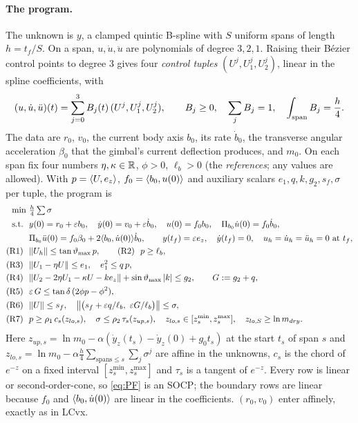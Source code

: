 \paragraph{The program.} The unknown is $y$, a clamped quintic B-spline with $S$ uniform spans of length $h=t_f/S$. On a span,
$u,\dot u,\ddot u$ are polynomials of degree $3,2,1$. Raising their B\'ezier control points to degree $3$ gives four \emph{control
tuples} $(U^j,U_1^j,U_2^j)$, linear in the spline coefficients, with
\begin{equation}\label{eq:hull}
(u,\dot u,\ddot u)(t)=\sum_{j=0}^3B_j(t)\,(U^j,U_1^j,U_2^j),\qquad B_j\ge0,\quad \sum_jB_j=1,\quad \int_{\rm span}B_j=\frac h4 .
\end{equation}
The data are $r_0$, $v_0$, the current body axis $b_0$, its rate $\dot b_0$, the transverse angular acceleration $\beta_0$ that the
gimbal's current deflection produces, and $m_0$. On each span fix four numbers $\eta,\kappa\in\mathbb{R}$, $\phi>0$, $\ell_b>0$ (the
\emph{references}; any values are allowed). With $p=\langle U,e_z\rangle$, $f_0=\langle b_0,u(0)\rangle$ and auxiliary scalars $e_1,q,k,g_2,s_f,\sigma$ per tuple, the
program is
\begin{equation}\label{eq:PF}
\begin{aligned}
\min\ & \tfrac h4\textstyle\sum\sigma\\
\text{s.t.}\ \ & y(0)=r_0+\varepsilon b_0,\quad \dot y(0)=v_0+\varepsilon\dot b_0,\quad u(0)=f_0b_0,\quad \Pi_{b_0}\dot u(0)=f_0\dot b_0,\\
& \Pi_{b_0}\ddot u(0)=f_0\beta_0+2\langle b_0,\dot u(0)\rangle\dot b_0,\qquad y(t_f)=\varepsilon e_z,\quad \dot y(t_f)=0,\quad u_h=\dot u_h=\ddot u_h=0\ \text{at }t_f,\\
\text{(R1)}\ \ & \lVert U_h\rVert\le\tan\vartheta_{\max}\,p, \qquad\text{(R2)}\ \ p\ge\ell_b,\\
\text{(R3)}\ \ & \lVert U_1-\eta U\rVert\le e_1,\quad e_1^2\le q\,p,\\
\text{(R4)}\ \ & \lVert U_2-2\eta U_1-\kappa U-ke_z\rVert+\sin\vartheta_{\max}\,|k|\le g_2,\qquad G:=g_2+q,\\
\text{(R5)}\ \ & \varepsilon\,G\le\tan\delta\,(2\phi p-\phi^2),\\
\text{(R6)}\ \ & \lVert U\rVert\le s_f,\quad \bigl\|\bigl(s_f+\varepsilon q/\ell_b,\ \varepsilon G/\ell_b\bigr)\bigr\|\le\sigma,\\
\text{(R7)}\ \ & p\ge\rho_1\,c_s(z_{lo,s}),\quad \sigma\le\rho_2\,\tau_s(z_{up,s}),\quad z_{lo,s}\in[z^{\min}_s,z^{\max}_s],\quad z_{lo,S}\ge\ln m_{dry}.
\end{aligned}
\end{equation}
Here $z_{up,s}=\ln m_0-\alpha(\dot y_z(t_s)-\dot y_z(0)+g_0t_s)$ at the start $t_s$ of span $s$ and
$z_{lo,s}=\ln m_0-\alpha\tfrac h4\sum_{\text{spans}\le s}\sum_j\sigma^j$ are affine in the unknowns, $c_s$ is the chord of $e^{-z}$ on a fixed
interval $[z^{\min}_s,z^{\max}_s]$ and $\tau_s$ is a tangent of $e^{-z}$. Every row is linear or second-order-cone, so \eqref{eq:PF} is an SOCP;
the boundary rows are linear because $f_0$ and $\langle b_0,\dot u(0)\rangle$ are linear in the coefficients. $(r_0,v_0)$ enter affinely, exactly as
in LCvx.

